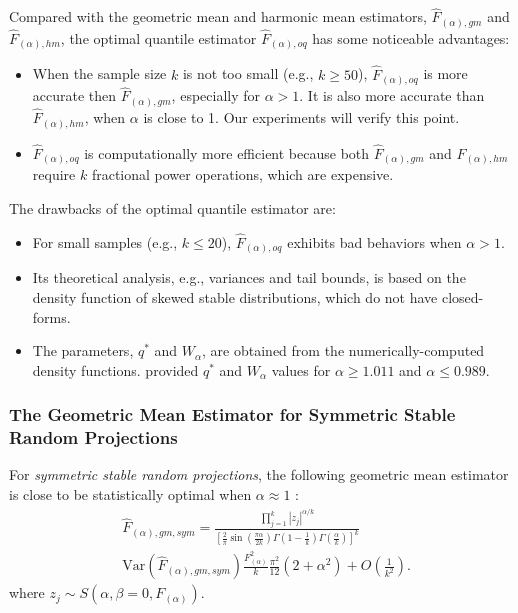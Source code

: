 \documentclass{sig-alternate}
\begin{document}
Compared with the geometric mean and harmonic mean estimators, $\hat{F}_{(\alpha),gm}$ and $\hat{F}_{(\alpha),hm}$, the optimal quantile estimator $\hat{F}_{(\alpha),oq}$ has some noticeable advantages:
\begin{itemize}
\item When the sample size $k$ is not too small (e.g., $k\geq 50$), $\hat{F}_{(\alpha),oq}$ is more accurate then $\hat{F}_{(\alpha),gm}$, especially for $\alpha>1$. It is also more accurate than $\hat{F}_{(\alpha),hm}$, when $\alpha$ is close to 1. Our experiments will verify this point.
\item $\hat{F}_{(\alpha),oq}$ is computationally more efficient because both $\hat{F}_{(\alpha),gm}$ and $\hat{F}_{(\alpha),hm}$ require $k$ fractional power operations, which are expensive.
\end{itemize}

The drawbacks of the optimal quantile estimator are:
\begin{itemize}
\item For small samples (e.g., $k\leq20$), $\hat{F}_{(\alpha),oq}$ exhibits bad behaviors when $\alpha>1$.
\item Its theoretical analysis, e.g., variances and tail bounds, is based on the density function of skewed stable distributions, which do not have closed-forms.
\item The  parameters, $q^*$ and $W_\alpha$, are obtained from the numerically-computed density functions. \cite{Report:Li_CC_oq} provided $q^*$ and $W_\alpha$ values for $\alpha\geq 1.011$ and $\alpha\leq 0.989$.
\end{itemize}

\subsubsection{The Geometric Mean Estimator for Symmetric Stable Random Projections}


For {\em symmetric stable random projections}, the following geometric mean estimator is close to be statistically optimal when $\alpha\approx 1$ \cite{Proc:Li_SODA08}:
\begin{align}\label{eqn_F_gm_sym}
&\hat{F}_{(\alpha),gm,sym} = \frac{\prod_{j=1}^k |z_j|^{\alpha/k}} { \left[\frac{2}{\pi}\sin\left(\frac{\pi\alpha}{2k}\right)\Gamma\left(1-\frac{1}{k}\right)\Gamma\left(\frac{\alpha}{k}\right)\right]^k}\\\label{eqn_F_gm_sym_var}
&\text{Var}\left(\hat{F}_{(\alpha),gm,sym}\right)
\frac{F_{(\alpha)}^2}{k}\frac{\pi^2}{12}\left(2+\alpha^2\right)+O\left(\frac{1}{k^2}\right).
\end{align}
\noindent where $z_j \sim S\left(\alpha,\beta=0,F_{(\alpha)}\right)$.
\end{document}
